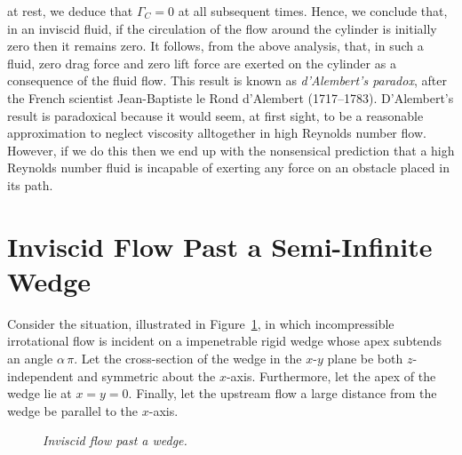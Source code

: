 at rest,  we deduce that $\Gamma_C=0$ at all subsequent times. Hence, we conclude that, in an inviscid fluid, 
if the circulation of the flow around the cylinder is initially zero then it remains zero. It follows, from the above
analysis, that, in such a fluid, zero drag force and zero lift force are exerted on the cylinder as a consequence of the
fluid flow.  This result is known as {\em d'Alembert's paradox}, after the French scientist Jean-Baptiste le Rond d'Alembert (1717--1783). D'Alembert's result is  paradoxical because it would seem, at
first sight, to be a reasonable approximation to neglect viscosity alltogether in high Reynolds number flow. However, if
we do this then we end up with the nonsensical  prediction that a high Reynolds number fluid is incapable of
exerting any force on an obstacle placed in its path.

\section{Inviscid Flow Past a Semi-Infinite Wedge}\label{swedge}
Consider the situation, illustrated in Figure~\ref{fwedge}, in which incompressible irrotational flow is incident on a
impenetrable rigid wedge whose apex subtends an angle $\alpha\,\pi$. Let the cross-section of the wedge in the $x$-$y$ plane
be both $z$-independent and symmetric about the $x$-axis. Furthermore, let the apex of
the wedge lie at $x=y=0$. Finally, let the upstream flow a large distance from the
wedge be parallel to the $x$-axis.

\begin{figure}
\epsfysize=3in
\centerline{}
\caption{\em Inviscid flow past a wedge.}\label{fwedge}
\end{figure}

